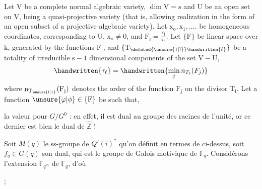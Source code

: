 Let $\mathrm{V}$ be a complete normal algebraic variety,
$\mathrm{\dim V=s}$ and $\mathrm{U}$ be an open set on $\mathrm{V}$, being a quasi-projective
variety (that is, allowing realization in the
form of an open subset of a projective algebraic variety).
Let $\mathrm{x_o,x_1,....}$ be homogeneous coordinates, corresponding
to $\mathrm{U}$, $\mathrm{x_o\ne 0}$, and $\mathrm{F_j=\frac{x_j}{x_o}}$. Let $\mathrm{\{F\}}$ be  linear space
over $\mathrm{k}$, generated by the functions $\mathrm{F_j}$, and $\mathrm{\{T_{\deleted{\unsure{1|l}}\handwritten{\ell}}\}}$ be a
\margin{\handwritten{$\mathrm{\ell}$}}
totality of irreducible $\mathrm{s-1}$ dimensional components of
the set $\mathrm{V-U}$,
\[
\handwritten{\tau_\ell} = \handwritten{\min_j n_{T_\ell}(F_j)}
\]
where $\mathrm{n_{T_{\unsure{l|1}}}(F_j)}$ denotes the order of the function $\mathrm{F_j}$ on
the divisor $\mathrm{T_l}$. Let a function $\mathrm{\unsure{\varphi|\phi}\in\{F\}}$ be such that,

la valeur  pour  $G/G^0$ :  en effet, il est dual au groupe des racines de l'unité, or ce dernier est bien le dual de $\widehat{\mathbb Z}$ !


Soit $M(q)$ le ss-groupe de $Q'(i)^*$ qu'on définit en termes de  ci-dessus, soit  $f_q\in G(q)$ son dual, qui est le groupe de Galois motivique de $\mathbb F_q$. Considérons l'extension $\mathbb F_{q^m}$ de $\mathbb F_q$, d'où


;

